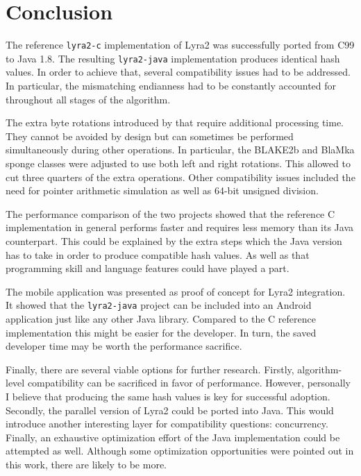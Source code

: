 \chapter{Conclusion}
\label{sec:conclusion}

The reference \texttt{lyra2-c} implementation of Lyra2 was successfully ported from C99 to Java 1.8. The resulting \texttt{lyra2-java} implementation produces identical hash values. In order to achieve that, several compatibility issues had to be addressed. In particular, the mismatching endianness had to be constantly accounted for throughout all stages of the algorithm.

The extra byte rotations introduced by that require additional processing time. They cannot be avoided by design but can sometimes be performed simultaneously during other operations. In particular, the BLAKE2b and BlaMka sponge classes were adjusted to use both left and right rotations. This allowed to cut three quarters of the extra operations. Other compatibility issues included the need for pointer arithmetic simulation as well as 64-bit unsigned division.

The performance comparison of the two projects showed that the reference C implementation in general performs faster and requires less memory than its Java counterpart. This could be explained by the extra steps which the Java version has to take in order to produce compatible hash values. As well as that programming skill and language features could have played a part.

The mobile application was presented as proof of concept for Lyra2 integration. It showed that the \texttt{lyra2-java} project can be included into an Android application just like any other Java library. Compared to the C reference implementation this might be easier for the developer. In turn, the saved developer time may be worth the performance sacrifice.

Finally, there are several viable options for further research. Firstly, algorithm-level compatibility can be sacrificed in favor of performance. However, personally I believe that producing the same hash values is key for successful adoption. Secondly, the parallel version of Lyra2 could be ported into Java. This would introduce another interesting layer for compatibility questions: concurrency. Finally, an exhaustive optimization effort of the Java implementation could be attempted as well. Although some optimization opportunities were pointed out in this work, there are likely to be more.
